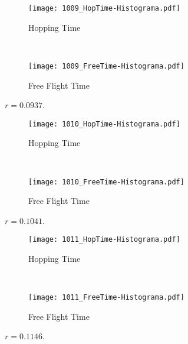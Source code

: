 \documentclass[a4paper,10pt]{article}
\begin{document}
\clearpage

\begin{figure}[h]
        \centering
        \begin{subfigure}[b]{0.45\textwidth}
                \centering
                \texttt{[image: 1009\_HopTime-Histograma.pdf]}
                \caption{Hopping Time}              
        \end{subfigure}%
        ~ %
        \begin{subfigure}[b]{0.45\textwidth}
                \centering
                \texttt{[image: 1009\_FreeTime-Histograma.pdf]}
                \caption{Free Flight Time}                
        \end{subfigure}       
        \caption{ $r=0.0937$. }
\end{figure}


\begin{figure}[h]
        \centering
        \begin{subfigure}[b]{0.45\textwidth}
                \centering
                \texttt{[image: 1010\_HopTime-Histograma.pdf]}
                \caption{Hopping Time}              
        \end{subfigure}%
        ~ %
        \begin{subfigure}[b]{0.45\textwidth}
                \centering
                \texttt{[image: 1010\_FreeTime-Histograma.pdf]}
                \caption{Free Flight Time}                
        \end{subfigure}       
        \caption{ $r=0.1041$. }
\end{figure}

\begin{figure}[h]
        \centering
        \begin{subfigure}[b]{0.45\textwidth}
                \centering
                \texttt{[image: 1011\_HopTime-Histograma.pdf]}
                \caption{Hopping Time}              
        \end{subfigure}%
        ~ %
        \begin{subfigure}[b]{0.45\textwidth}
                \centering
                \texttt{[image: 1011\_FreeTime-Histograma.pdf]}
                \caption{Free Flight Time}                
        \end{subfigure}       
        \caption{ $r=0.1146$. }
\end{figure}
\end{document}
